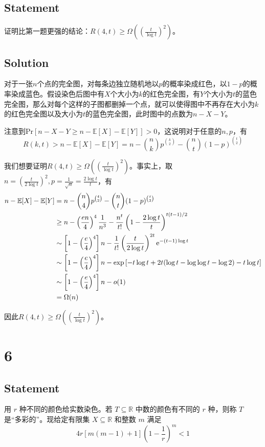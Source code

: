 \documentclass[UTF-8]{ctexart}
\begin{document}
\subsection*{Statement}
证明比第一题更强的结论：$R(4, t) \ge \Omega\left(\left( \frac{t}{\log t} \right)^2\right)$。
\subsection*{Solution}
对于一张$n$个点的完全图，对每条边独立随机地以$p$的概率染成红色，以$1-p$的概率染成蓝色。假设染色后图中有$X$个大小为$k$的红色完全图，有$Y$个大小为$t$的蓝色完全图，那么对每个这样的子图都删掉一个点，就可以使得图中不再存在大小为$k$的红色完全图以及大小为$t$的蓝色完全图，此时图中的点数为$n - X - Y$。

注意到$\text{Pr}\left[n - X - Y \ge n - \mathbb E[X] - \mathbb E[Y] \right] > 0$，这说明对于任意的$n, p$，有\begin{equation}
R(k, t) > n - \mathbb E[X] - \mathbb E[Y] = n - \binom nk p^{\binom k2} - \binom nt (1-p)^{\binom t2}
\end{equation}

我们想要证明$R(4, t) \ge \Omega\left(\left( \frac{t}{\log t} \right)^2\right)$。事实上，取$n = \left( \frac{t}{2\log t} \right)^2, p = \frac{1}{\sqrt n} = \frac{2\log t}{t}$，有
\begin{equation}
\begin{split}
	n - \mathbb E[X] - \mathbb E[Y] 
	&= n - \binom n4 p^{\binom 42} - \binom nt (1-p)^{\binom t2}\\
	&\ge n - \left(\frac{en}{4}\right)^4\frac{1}{n^3} - \frac{n^t}{t!}\left(1 - \frac{2\log t}{t}\right)^{t(t-1)/2}\\
	& \sim \left[1 - \left(\frac{e}{4}\right)^4 \right]n - \frac{1}{t!}\left(\frac{t}{2\log t}\right)^{2t}\text e^{-(t-1)\log t}\\
	& \sim \left[1 - \left(\frac{e}{4}\right)^4 \right]n - \exp\left[ -t\log t + 2t(\log t - \log \log t - \log 2) - t\log t\right]\\
	&\sim \left[1 - \left(\frac{e}{4}\right)^4 \right]n - o(1)\\
	&= \Omega(n)
\end{split}
\end{equation}

因此$R(4, t) \ge \Omega\left(\left( \frac{t}{\log t} \right)^2\right)$。
\section*{6}
\subsection*{Statement}
用 $r$ 种不同的颜色给实数染色。若 $T \subseteq \mathbb R$ 中数的颜色有不同的 $r$ 种，则称 $T$ 是“多彩的”。现给定有限集 $X \subseteq \mathbb R$ 和整数 $m$ 满足
\begin{equation}
4r[m(m-1) + 1]\left(1-\frac1r\right)^m < 1
\label{t4_state}
\end{equation}
\end{document}
